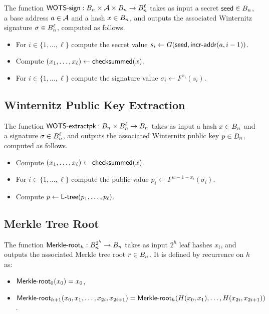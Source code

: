 The function $\textsf{WOTS-sign} : B_n \times \mathcal{A} \times B_n \to B_n^\ell$ takes as input a secret $\textsf{seed} \in B_n$, a base address $a \in \mathcal{A}$ and a hash $x \in B_n$, and outputs the associated Winternitz signature $\sigma \in B_n^\ell$, computed as follows.

\begin{itemize}
\item For $i \in \{1, \ldots, \ell\}$ compute the secret value $s_i \gets G(\textsf{seed}, \textsf{incr-addr}(a, i-1))$.
\item Compute $(x_1, \ldots, x_\ell) \gets \textsf{checksummed}(x)$.
\item For $i \in \{1, \ldots, \ell\}$ compute the signature value $\sigma_i \gets F^{x_i}(s_i)$.
\end{itemize}

\subsection{Winternitz Public Key Extraction}

The function $\textsf{WOTS-extractpk} : B_n \times B_n^\ell \to B_n$ takes as input a hash $x \in B_n$ and a signature $\sigma \in B_n^\ell$, and outputs the associated Winternitz public key $p \in B_n$, computed as follows.

\begin{itemize}
\item Compute $(x_1, \ldots, x_\ell) \gets \textsf{checksummed}(x)$.
\item For $i \in \{1, \ldots, \ell\}$ compute the public value $p_i \gets F^{w-1-x_i}(\sigma_i)$.
\item Compute $p \gets \textsf{L-tree}(p_1, \ldots, p_\ell)$.
\end{itemize}

\subsection{Merkle Tree Root}

The function $\textsf{Merkle-root}_h : B_n^{2^h} \to B_n$ takes as input $2^h$ leaf hashes $x_i$, and outputs the associated Merkle tree root $r \in B_n$.
It is defined by recurrence on $h$ as:

\begin{itemize}
\item $\textsf{Merkle-root}_0(x_0) = x_0$,
\item $\textsf{Merkle-root}_{h+1}(x_0, x_1, \ldots, x_{2i}, x_{2i+1}) = \textsf{Merkle-root}_h(H(x_0, x_1), \ldots, H(x_{2i}, x_{2i+1}))$.
\end{itemize}

